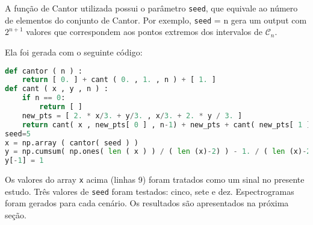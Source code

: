A função de Cantor utilizada possui o parâmetro \texttt{seed}, que equivale ao número de elementos do conjunto de Cantor. Por exemplo, \texttt{seed} = n gera um output com $2^{n+1}$ valores que correspondem aos pontos extremos dos intervalos de $\mathcal{C}_{n}$. 

Ela foi gerada com o seguinte código:
\begin{lstlisting}[language=python,style=mystyle1]
def cantor ( n ) :
    return [ 0. ] + cant ( 0. , 1. , n ) + [ 1. ]
def cant ( x , y , n ) :
    if n == 0:
        return [ ]
    new_pts = [ 2. * x/3. + y/3. , x/3. + 2. * y / 3. ]
    return cant( x , new_pts[ 0 ] , n-1) + new_pts + cant( new_pts[ 1 ] , y , n-1)
seed=5
x = np.array ( cantor( seed ) )
y = np.cumsum( np.ones( len ( x ) ) / ( len (x)-2) ) - 1. / ( len (x)-2)
y[-1] = 1
\end{lstlisting}

Os valores do array \texttt{x} acima (linhas 9) foram tratados como um sinal no presente estudo. Três valores de \texttt{seed} foram testados: cinco, sete e dez. Espectrogramas foram gerados para cada cenário. Os resultados são apresentados na próxima seção.